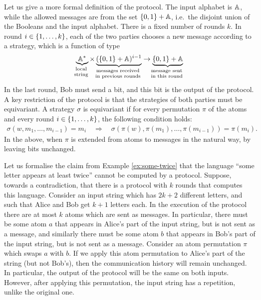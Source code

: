 Let us give a more formal definition of the protocol. The input alphabet is $\mathbb A$, while the allowed messages are from the set $\{0,1\} + \mathbb A$, i.e.~the disjoint union of the Booleans and the input alphabet.
There is a fixed number of rounds $k$. In round $i \in \{1,\ldots,k\}$, each of the two parties chooses a new message according to a strategy, which is a function of type
\begin{align*}
\myunderbrace{\atoms^*}{local \\ string} \times \myunderbrace{(\set{0,1} + \atoms)^{i-1}}{messages received \\ in previous rounds} 
\to
\myunderbrace{\set{0,1} + \atoms}{message sent \\ in this round}
\end{align*}
In the last round, Bob must send a bit, and this bit is the output of the protocol. A key restriction of the protocol is that the strategies of both parties must be equivariant. A strategy $\sigma$  is equivariant if for every permutation $\pi$ of the atoms and every round $i \in \{1,\ldots,k\}$, the following condition holds:  
\begin{align*}
\sigma(w, m_1, \ldots, m_{i-1}) = m_i 
\quad \Rightarrow \quad
\sigma(\pi(w), \pi(m_1), \ldots, \pi(m_{i-1})) = \pi(m_i).
\end{align*}
In the above, when $\pi$ is extended from atoms to messages in the natural way, by leaving bits unchanged. 

\begin{myexample}
    Let us formalise the claim from Example \ref{ex:some-twice} that the language ``some letter appears at least twice'' cannot be computed by a protocol. Suppose, towards a contradiction, that there is a protocol with $k$ rounds that computes this language. Consider an input string which has $2k+2$ different letters, and such that Alice and Bob get $k+1$ letters each. In the execution of the protocol there are at most $k$ atoms which are sent as messages. In particular, there must be some atom $a$ that appears in Alice's part of the input string, but is not sent as a message, and similarly there must be some atom $b$ that appears in Bob's part of the input string, but is not sent as a message. Consider an atom permutation $\pi$ which swaps $a$ with $b$. If we apply this atom permutation to Alice's part of the string (but not Bob's), then the communication history will remain unchanged. In particular, the output of the protocol will be the same on both inputs. However, after applying this permutation, the input string has a repetition, unlike the original one. 
\end{myexample}


